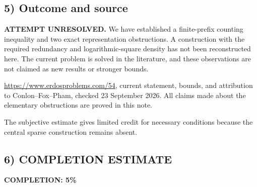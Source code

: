 \subsection*{5) Outcome and source}
\textbf{ATTEMPT UNRESOLVED.} We have established a finite-prefix counting inequality and two exact representation obstructions. A construction with the required redundancy and logarithmic-square density has not been reconstructed here. The current problem is solved in the literature, and these observations are not claimed as new results or stronger bounds.

\url{https://www.erdosproblems.com/54}, current statement, bounds, and attribution to Conlon--Fox--Pham, checked 23 September 2026. All claims made about the elementary obstructions are proved in this note.

The subjective estimate gives limited credit for necessary conditions because the central sparse construction remains absent.
\subsection*{6) COMPLETION ESTIMATE}
\textbf{COMPLETION: 5\%}
